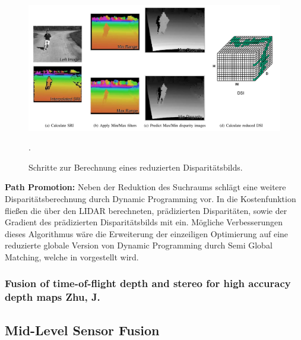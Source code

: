 \documentclass[10pt]{article}
\begin{document}
\begin{figure}[ht]\centering%
	\includegraphics[width=15cm]{images/png/badino_dsi_computation.png}
	\caption[Reduziertes Disparitätsbild]{ Schritte zur Berechnung eines reduzierten Disparitätsbilds. \cite{Badino2011a} }.
	\label{img:badino_computation}
\end{figure}

\textbf{Path Promotion:} Neben der Reduktion des Suchraums schlägt \cite{Badino2011a} eine weitere Disparitätsberechnung durch Dynamic Programming vor. In die Kostenfunktion fließen die über den LIDAR berechneten, prädizierten Disparitäten, sowie der Gradient des prädizierten Disparitätsbilds mit ein.
Mögliche Verbesserungen dieses Algorithmus wäre die Erweiterung der einzeiligen Optimierung auf eine reduzierte globale Version von Dynamic Programming durch Semi Global Matching, welche in \cite{Hirschmuller2005} vorgestellt wird.

\subsubsection*{Fusion of time-of-flight depth and stereo for high accuracy depth maps Zhu, J. \cite{Zhu2008}}

\subsection*{Mid-Level Sensor Fusion}


\end{document}
